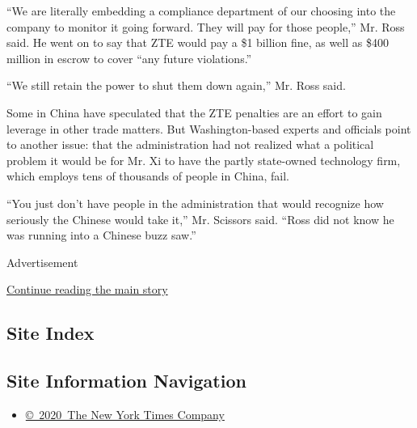 ``We are literally embedding a compliance department of our choosing
into the company to monitor it going forward. They will pay for those
people,'' Mr. Ross said. He went on to say that ZTE would pay a \$1
billion fine, as well as \$400 million in escrow to cover ``any future
violations.''

``We still retain the power to shut them down again,'' Mr. Ross said.

Some in China have speculated that the ZTE penalties are an effort to
gain leverage in other trade matters. But Washington-based experts and
officials point to another issue: that the administration had not
realized what a political problem it would be for Mr. Xi to have the
partly state-owned technology firm, which employs tens of thousands of
people in China, fail.

``You just don't have people in the administration that would recognize
how seriously the Chinese would take it,'' Mr. Scissors said. ``Ross did
not know he was running into a Chinese buzz saw.''

Advertisement

\protect\hyperlink{after-bottom}{Continue reading the main story}

\hypertarget{site-index}{%
\subsection{Site Index}\label{site-index}}

\hypertarget{site-information-navigation}{%
\subsection{Site Information
Navigation}\label{site-information-navigation}}

\begin{itemize}
\tightlist
\item
  \href{https://help.nytimes3xbfgragh.onion/hc/en-us/articles/115014792127-Copyright-notice}{©~2020~The
  New York Times Company}
\end{itemize}

